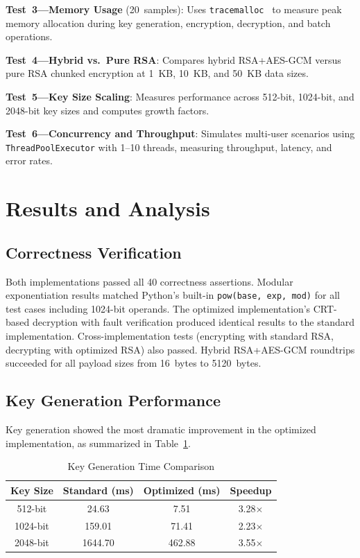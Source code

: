 \documentclass[journal]{IEEEtran}
\begin{document}
\textbf{Test~3---Memory Usage} (20~samples): Uses \texttt{tracemalloc}~\cite{python_tracemalloc} to measure peak memory allocation during key generation, encryption, decryption, and batch operations.

\textbf{Test~4---Hybrid vs.\ Pure RSA}: Compares hybrid RSA+AES-GCM versus pure RSA chunked encryption at 1~KB, 10~KB, and 50~KB data sizes.

\textbf{Test~5---Key Size Scaling}: Measures performance across 512-bit, 1024-bit, and 2048-bit key sizes and computes growth factors.

\textbf{Test~6---Concurrency and Throughput}: Simulates multi-user scenarios using \texttt{ThreadPoolExecutor} with 1--10 threads, measuring throughput, latency, and error rates.


\section{Results and Analysis}
\label{sec:results}

\subsection{Correctness Verification}

Both implementations passed all 40 correctness assertions. Modular exponentiation results matched Python's built-in \texttt{pow(base, exp, mod)} for all test cases including 1024-bit operands. The optimized implementation's CRT-based decryption with fault verification produced identical results to the standard implementation. Cross-implementation tests (encrypting with standard RSA, decrypting with optimized RSA) also passed. Hybrid RSA+AES-GCM roundtrips succeeded for all payload sizes from 16~bytes to 5120~bytes.

\subsection{Key Generation Performance}

Key generation showed the most dramatic improvement in the optimized implementation, as summarized in Table~\ref{tab:keygen}.

\begin{table}[!t]
\caption{Key Generation Time Comparison}
\label{tab:keygen}
\centering
\begin{tabular}{|c|c|c|c|}
\hline
\textbf{Key Size} & \textbf{Standard (ms)} & \textbf{Optimized (ms)} & \textbf{Speedup} \\
\hline
512-bit & 24.63 & 7.51 & 3.28$\times$ \\
\hline
1024-bit & 159.01 & 71.41 & 2.23$\times$ \\
\hline
2048-bit & 1644.70 & 462.88 & 3.55$\times$ \\
\hline
\end{tabular}
\end{table}
\end{document}
